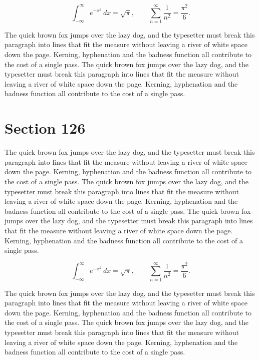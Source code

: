 \documentclass{article}
\begin{document}
\begin{equation}
\int_{-\infty}^{\infty} e^{-x^{2}}\,dx = \sqrt{\pi}, \qquad
\sum_{n=1}^{\infty} \frac{1}{n^{2}} = \frac{\pi^{2}}{6}.
\end{equation}

The quick brown fox jumps over the lazy dog, and the typesetter must break this paragraph into lines that fit the measure without leaving a river of white space down the page. Kerning, hyphenation and the badness function all contribute to the cost of a single pass. The quick brown fox jumps over the lazy dog, and the typesetter must break this paragraph into lines that fit the measure without leaving a river of white space down the page. Kerning, hyphenation and the badness function all contribute to the cost of a single pass. 
\section{Section 126}
The quick brown fox jumps over the lazy dog, and the typesetter must break this paragraph into lines that fit the measure without leaving a river of white space down the page. Kerning, hyphenation and the badness function all contribute to the cost of a single pass. The quick brown fox jumps over the lazy dog, and the typesetter must break this paragraph into lines that fit the measure without leaving a river of white space down the page. Kerning, hyphenation and the badness function all contribute to the cost of a single pass. The quick brown fox jumps over the lazy dog, and the typesetter must break this paragraph into lines that fit the measure without leaving a river of white space down the page. Kerning, hyphenation and the badness function all contribute to the cost of a single pass. 

\begin{equation}
\int_{-\infty}^{\infty} e^{-x^{2}}\,dx = \sqrt{\pi}, \qquad
\sum_{n=1}^{\infty} \frac{1}{n^{2}} = \frac{\pi^{2}}{6}.
\end{equation}

The quick brown fox jumps over the lazy dog, and the typesetter must break this paragraph into lines that fit the measure without leaving a river of white space down the page. Kerning, hyphenation and the badness function all contribute to the cost of a single pass. The quick brown fox jumps over the lazy dog, and the typesetter must break this paragraph into lines that fit the measure without leaving a river of white space down the page. Kerning, hyphenation and the badness function all contribute to the cost of a single pass. 
\end{document}

